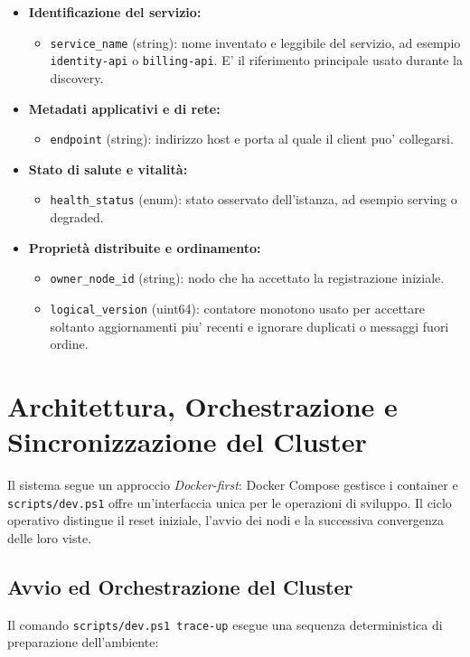 \documentclass[conference]{IEEEtran}
\begin{document}
\begin{itemize}[leftmargin=1.2cm]
  \item \textbf{Identificazione del servizio:}
  \begin{itemize}
    \item \texttt{service\_name} (string): nome inventato e leggibile del servizio, ad esempio \texttt{identity-api} o \texttt{billing-api}. E' il riferimento principale usato durante la discovery.
  \end{itemize}
  
  \item \textbf{Metadati applicativi e di rete:}
  \begin{itemize}
    \item \texttt{endpoint} (string): indirizzo host e porta al quale il client puo' collegarsi.
  \end{itemize}

  \item \textbf{Stato di salute e vitalità:}
  \begin{itemize}
    \item \texttt{health\_status} (enum): stato osservato dell'istanza, ad esempio serving o degraded.
  \end{itemize}

  \item \textbf{Proprietà distribuite e ordinamento:}
  \begin{itemize}
    \item \texttt{owner\_node\_id} (string): nodo che ha accettato la registrazione iniziale.
    \item \texttt{logical\_version} (uint64): contatore monotono usato per accettare soltanto aggiornamenti piu' recenti e ignorare duplicati o messaggi fuori ordine.
  \end{itemize}
\end{itemize}

\section{Architettura, Orchestrazione e Sincronizzazione del Cluster}
\label{sec:architettura_cluster}

Il sistema segue un approccio \textit{Docker-first}: Docker Compose gestisce i container e \texttt{scripts/dev.ps1} offre un'interfaccia unica per le operazioni di sviluppo. Il ciclo operativo distingue il reset iniziale, l'avvio dei nodi e la successiva convergenza delle loro viste.

\subsection{Avvio ed Orchestrazione del Cluster}
Il comando \texttt{scripts/dev.ps1 trace-up} esegue una sequenza deterministica di preparazione dell'ambiente:
\end{document}
